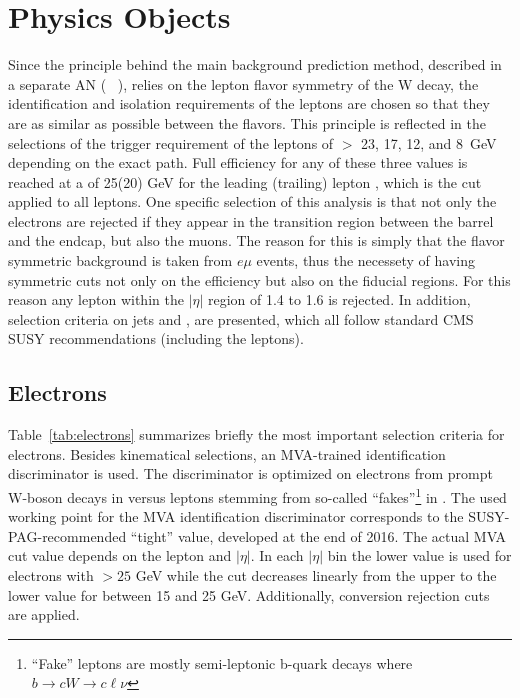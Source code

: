 \section{Physics Objects}
\label{subsec:objects}
Since the principle behind the main background prediction method, described in a separate AN ( ~\cite{CMS_AN_2016-482}), relies on the lepton flavor symmetry of the W decay, the identification and 
isolation requirements of 
the leptons are chosen so that they are as similar as possible between the flavors. This principle is reflected in the selections of the trigger requirement of the leptons of \pt $>$ 23, 17, 12, 
and 8~GeV depending on the exact path. Full efficiency for any of these three values is reached at a \pt of 25(20) GeV for the leading (trailing) lepton , which is
the cut applied to all leptons. One specific selection of this analysis is that not only the electrons are rejected if they appear in the transition region between
the barrel and the endcap, but also the muons. The reason for this is simply that the flavor symmetric background is taken from $e\mu$ events, thus
the necessety of having symmetric cuts not only on the efficiency but also on the fiducial regions. For this reason any lepton within the $|\eta|$ region of 1.4 to 1.6 is rejected.
In addition, selection criteria on jets and \ptmiss, are presented, which all follow standard CMS SUSY recommendations (including the leptons).

\subsection{Electrons}
\label{subsub:electrons}

Table~\ref{tab:electrons} summarizes briefly the most important selection criteria for electrons. Besides kinematical selections, an MVA-trained identification discriminator is used. 
The discriminator is optimized on electrons from prompt W-boson decays in \ttbar versus leptons stemming from so-called ``fakes''\footnote{``Fake'' leptons
are mostly semi-leptonic b-quark decays where $b \rightarrow cW \rightarrow c\ell \nu$} in \ttbar. The used working point for the MVA identification discriminator corresponds to the 
SUSY-PAG-recommended ``tight'' value, developed at the end of 2016. The actual MVA cut value depends on the lepton \pt and $|\eta|$. In each $|\eta|$ bin the lower value is used for electrons
with \pt $> 25$ GeV while the cut decreases linearly from the upper to the lower value for \pt between 15 and 25 GeV. Additionally, conversion rejection cuts are applied. 

